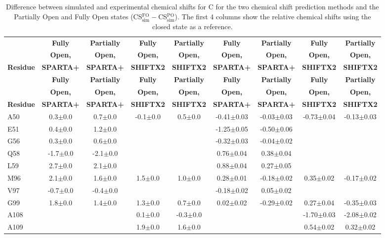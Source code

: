\documentclass[%
 aip,
 amsmath,amssymb,
 preprint,%
]{revtex4-1}
\begin{document}
\begingroup
\begin{center}
\begin{longtable}{l|c|c|c|c|c|c|c|c}
\caption{\scriptsize Difference between simulated and experimental chemical shifts for C for the two chemical shift prediction methods and the Partially Open and Fully Open states (CS$_\text{sim}^\text{FO}-$CS$_\text{sim}^\text{PO}$). The first 4 columns show the relative chemical shifts using the closed state as a reference.  \label{SI_tb_DDCS_C}}\\ 
\hline 
\hline 
\footnotesize
& \textbf{Fully} & \textbf{Partially} & \textbf{Fully} & \textbf{Partially} & \textbf{Fully} & \textbf{Partially} & \textbf{Fully} & \textbf{Partially} \\
& \textbf{Open,} & \textbf{Open,} & \textbf{Open,} & \textbf{Open,} & \textbf{Open,} & \textbf{Open,} & \textbf{Open,} & \textbf{Open,} \\
\textbf{Residue} & \textbf{SPARTA+} & \textbf{SPARTA+} & \textbf{SHIFTX2} & \textbf{SHIFTX2} & \textbf{SPARTA+} & \textbf{SPARTA+} & \textbf{SHIFTX2} & \textbf{SHIFTX2} \\
\hline
\endfirsthead 
\hline
& \textbf{Fully} & \textbf{Partially} & \textbf{Fully} & \textbf{Partially} & \textbf{Fully} & \textbf{Partially} & \textbf{Fully} & \textbf{Partially} \\
& \textbf{Open,} & \textbf{Open,} & \textbf{Open,} & \textbf{Open,} & \textbf{Open,} & \textbf{Open,} & \textbf{Open,} & \textbf{Open,} \\
\textbf{Residue} & \textbf{SPARTA+} & \textbf{SPARTA+} & \textbf{SHIFTX2} & \textbf{SHIFTX2} & \textbf{SPARTA+} & \textbf{SPARTA+} & \textbf{SHIFTX2} & \textbf{SHIFTX2} \\\hline
\endhead
A50 & 0.3$\pm$0.0 & 0.7$\pm$0.0 & -0.1$\pm$0.0 & 0.5$\pm$0.0 & -0.41$\pm$0.03 & -0.03$\pm$0.03 & -0.73$\pm$0.04 & -0.13$\pm$0.03 \\
E51 & 0.4$\pm$0.0 & 1.2$\pm$0.0 & & & -1.25$\pm$0.05 & -0.50$\pm$0.06 & & \\
G56 & 0.3$\pm$0.0 & 0.6$\pm$0.0 & & & -0.32$\pm$0.03 & -0.04$\pm$0.02 & & \\
Q58 & -1.7$\pm$0.0 & -2.1$\pm$0.0 & & & 0.76$\pm$0.04 & 0.38$\pm$0.04 & & \\
L59 & 2.7$\pm$0.0 & 2.1$\pm$0.0 & & & 0.88$\pm$0.04 & 0.27$\pm$0.05 & & \\
M96 & 2.1$\pm$0.0 & 1.6$\pm$0.0 & 1.5$\pm$0.0 & 1.0$\pm$0.0 & 0.28$\pm$0.01 & -0.18$\pm$0.02 & 0.35$\pm$0.02 & -0.17$\pm$0.02 \\
V97 & -0.7$\pm$0.0 & -0.4$\pm$0.0 & & & -0.18$\pm$0.02 & 0.05$\pm$0.02 & & \\
G99 & 1.8$\pm$0.0 & 1.4$\pm$0.0 & 1.3$\pm$0.0 & 0.7$\pm$0.0 & 0.02$\pm$0.02 & -0.29$\pm$0.02 & 0.27$\pm$0.04 & -0.35$\pm$0.03 \\
A108 & & & 0.1$\pm$0.0 & -0.3$\pm$0.0 & & & -1.70$\pm$0.03 & -2.08$\pm$0.02 \\
A109 & & & 1.9$\pm$0.0 & 1.6$\pm$0.0 & & & 0.54$\pm$0.02 & 0.32$\pm$0.02 \\
\end{longtable}
\end{center}
\endgroup
\end{document}
